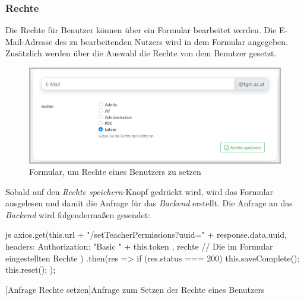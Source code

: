\subsubsection{Rechte}
Die Rechte für Benutzer können über ein Formular bearbeitet werden. Die E-Mail-Adresse des zu bearbeitenden Nutzers wird in dem Formular angegeben. Zusätzlich werden über die Auswahl die Rechte von dem Benutzer gesetzt.
\begin{figure}[H]
	\centering
	\includegraphics[width=1\linewidth]{images/rfoster_implementierung/rights}
	\caption[Formular der Rechte]{Formular, um Rechte eines Benutzers zu setzen}
	\label{fig:rightsform}
\end{figure}
Sobald auf den \textit{Rechte speichern}-Knopf gedrückt wird, wird das Formular ausgelesen und damit die Anfrage für das \textit{Backend} erstellt. Die Anfrage an das \textit{Backend} wird folgendermaßen gesendet:
\begin{code}{js}
	axios.get(this.url + "/setTeacherPermissions?uuid=" + response.data.uuid,
	{
		headers: {
			Authorization: "Basic " + this.token
		}
	}, rechte	// Die im Formular eingestellten Rechte
	)
	.then(res => {
		if (res.status === 200) {
			this.saveComplete();
			this.reset();
		}
	});
\end{code}
[Anfrage Rechte setzen]{Anfrage zum Setzen der Rechte eines Benutzers}~\\
